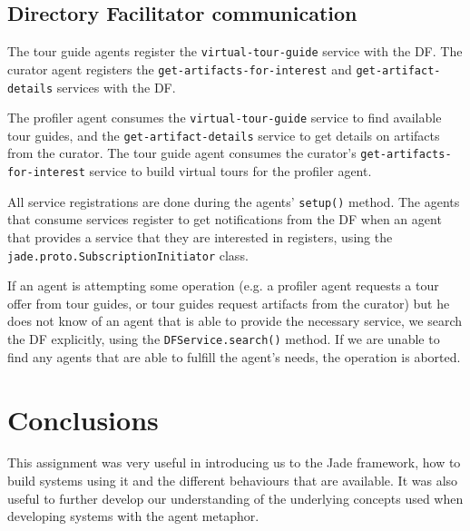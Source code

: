 \documentclass[a4paper, 11pt]{article}
\begin{document}
\subsection{Directory Facilitator communication}

The tour guide agents register the \texttt{virtual-tour-guide} service with the DF. The curator agent registers the \texttt{get-artifacts-for-interest} and \texttt{get-artifact-details} services with the DF.

The profiler agent consumes the \texttt{virtual-tour-guide} service to find available tour guides, and the \texttt{get-artifact-details} service to get details on artifacts from the curator. The tour guide agent consumes the curator's \texttt{get-artifacts-for-interest} service to build virtual tours for the profiler agent.

All service registrations are done during the agents' \texttt{setup()} method. The agents that consume services register to get notifications from the DF when an agent that provides a service that they are interested in registers, using the \texttt{jade.proto.SubscriptionInitiator} class.

If an agent is attempting some operation (e.g. a profiler agent requests a tour offer from tour guides, or tour guides request artifacts from the curator) but he does not know of an agent that is able to provide the necessary service, we search the DF explicitly, using the \texttt{DFService.search()} method. If we are unable to find any agents that are able to fulfill the agent's needs, the operation is aborted.

\section{Conclusions}

This assignment was very useful in introducing us to the Jade framework, how to build systems using it and the different behaviours that are available.
It was also useful to further develop our understanding of the underlying concepts used when developing systems with the agent metaphor.
\end{document}
